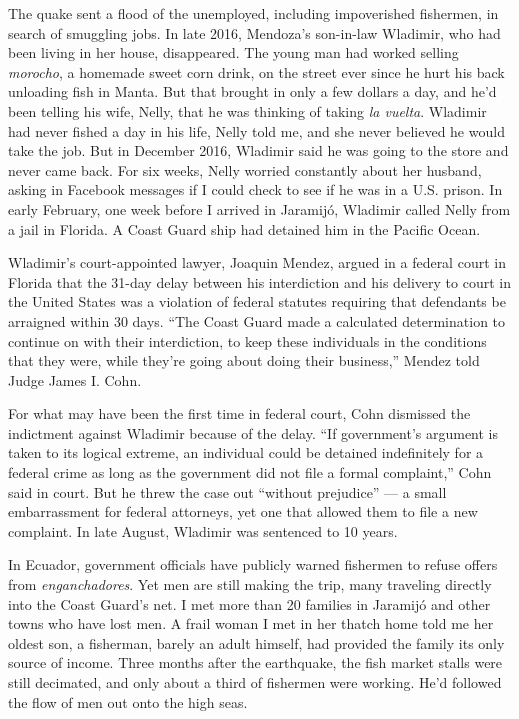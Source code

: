 The quake sent a flood of the unemployed, including impoverished
fishermen, in search of smuggling jobs. In late 2016, Mendoza's
son-in-law Wladimir, who had been living in her house, disappeared. The
young man had worked selling \emph{morocho}, a homemade sweet corn
drink, on the street ever since he hurt his back unloading fish in
Manta. But that brought in only a few dollars a day, and he'd been
telling his wife, Nelly, that he was thinking of taking \emph{la
vuelta}. Wladimir had never fished a day in his life, Nelly told me, and
she never believed he would take the job. But in December 2016, Wladimir
said he was going to the store and never came back. For six weeks, Nelly
worried constantly about her husband, asking in Facebook messages if I
could check to see if he was in a U.S. prison. In early February, one
week before I arrived in Jaramijó, Wladimir called Nelly from a jail in
Florida. A Coast Guard ship had detained him in the Pacific Ocean.

Wladimir's court-appointed lawyer, Joaquin Mendez, argued in a federal
court in Florida that the 31-day delay between his interdiction and his
delivery to court in the United States was a violation of federal
statutes requiring that defendants be arraigned within 30 days. ``The
Coast Guard made a calculated determination to continue on with their
interdiction, to keep these individuals in the conditions that they
were, while they're going about doing their business,'' Mendez told
Judge James I. Cohn.

For what may have been the first time in federal court, Cohn dismissed
the indictment against Wladimir because of the delay. ``If government's
argument is taken to its logical extreme, an individual could be
detained indefinitely for a federal crime as long as the government did
not file a formal complaint,'' Cohn said in court. But he threw the case
out ``without prejudice'' --- a small embarrassment for federal
attorneys, yet one that allowed them to file a new complaint. In late
August, Wladimir was sentenced to 10 years.

In Ecuador, government officials have publicly warned fishermen to
refuse offers from \emph{enganchadores}. Yet men are still making the
trip, many traveling directly into the Coast Guard's net. I met more
than 20 families in Jaramijó and other towns who have lost men. A frail
woman I met in her thatch home told me her oldest son, a fisherman,
barely an adult himself, had provided the family its only source of
income. Three months after the earthquake, the fish market stalls were
still decimated, and only about a third of fishermen were working. He'd
followed the flow of men out onto the high seas.

